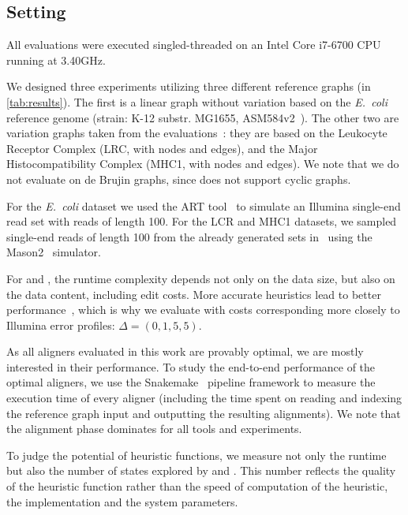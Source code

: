 \subsection{Setting}
All evaluations were executed singled-threaded on an Intel Core i7-6700 CPU running
at 3.40GHz.

We designed three experiments utilizing three different reference graphs (in
\cref{tab:results}). The first is a linear graph without variation based on the
\textit{E.~coli} reference genome (strain: K-12 substr. MG1655,
ASM584v2~\cite{howe2019ensembl}). The other two are variation graphs taken from
the \pasgal evaluations~\cite{jain_accelerating_2019}: they are based on the
Leukocyte Receptor Complex (LRC, with  nodes and
 edges), and the Major Histocompatibility Complex (MHC1, with
 nodes and  edges).
%
We note that we do not evaluate on de Brujin graphs, since \pasgal does not
support cyclic graphs.

For the \textit{E.~coli} dataset we used the ART tool~\cite{huang_art_2012} to simulate an
Illumina single-end read set with  reads of length 100. For the LCR and
MHC1 datasets, we sampled  single-end reads of length 100 from the already
generated sets in~\cite{jain_accelerating_2019} using the
Mason2~\cite{holtgrewe_mason_2010} simulator.

For \dijkstra and \astarix, the runtime complexity depends not only on the data
size, but also on the data content, including edit costs. More accurate
heuristics lead to better \A performance~\cite{pearl_discovery_1983}, which is
why we evaluate \astarix with costs corresponding more closely to Illumina error
profiles: $\Delta=(0,1,5,5)$.

As all aligners evaluated in this work are provably optimal, we are mostly
interested in their performance.
%
To study the end-to-end performance of the optimal aligners, we use the
Snakemake~\cite{koster_snakemakescalable_2012} pipeline framework to measure the
execution time of every aligner (including the time spent on reading and
indexing the reference graph input and outputting the resulting alignments). We
note that the alignment phase dominates for all tools and experiments.

To judge the potential of heuristic functions, we measure not only the runtime
but also the number of states explored by \astarix and \dijkstra. This number
reflects the quality of the heuristic function rather than the speed of
computation of the heuristic, the implementation and the system parameters.
